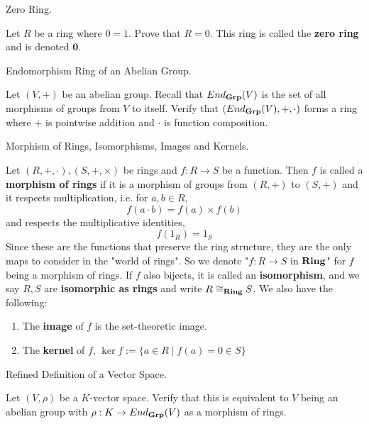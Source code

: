 \documentclass[../book.tex]{subfiles}
\begin{document}
\begin{ex} Zero Ring.
    
    Let $R$ be a ring where $0 = 1$. Prove that $R = {0}$.
    This ring is called the \textbf{zero ring} and is denoted $\textbf{0}$.
\end{ex}

\begin{ex} Endomorphism Ring of an Abelian Group. 

    Let $(V,+)$ be an abelian group. 
    Recall that $End_{\mathbf{Grp}}(V)$ is 
    the set of all morphisms of groups from $V$ to itself.
    Verify that $(End_{\mathbf{Grp}}(V),+,\cdot)$ forms a ring where
    $+$ is pointwise addition and $\cdot$ is function composition. 
    
\end{ex}

\begin{dfn} Morphism of Rings, Isomorphisms, Images and Kernels. 

    Let $(R,+,\cdot), (S,+,\times)$ be rings and $f : R \to S$ be a function. 
    Then $f$ is called a \textbf{morphism of rings} if 
    it is a morphism of groups from $(R,+)$ to $(S,+)$ and
    it respects multiplication, i.e. for $a, b \in R$, 
    \[f(a \cdot b) = f(a) \times f(b)\]
    and respects the multiplicative identities, 
    \[f(1_R) = 1_S\]
    Since these are the functions that preserve the ring structure, 
    they are the only maps to consider in the "world of rings".
    So we denote "$f : R \to S$ in $\mathbf{Ring}$" for $f$ being a morphism of rings. 
    If $f$ also bijects, it is called an \textbf{isomorphism}, and 
    we say $R, S$ are \textbf{isomorphic as rings}
    and write $R \cong_{\mathbf{Ring}} S$. 
    We also have the following: 
    \begin{enumerate}
        \item The \textbf{image} of $f$ is the set-theoretic image. 
        \item The \textbf{kernel} of $f$, 
        $\ker f := \{a \in R \mid f(a) = 0 \in S\}$
    \end{enumerate}
\end{dfn}

\begin{ex} [Important] Refined Definition of a Vector Space.

    Let $(V,\rho)$ be a $K$-vector space. 
    Verify that this is equivalent to $V$ being an abelian group
    with $\rho : K \to End_{\mathbf{Grp}}(V)$ as a morphism of rings. 
\end{ex}
\end{document}
